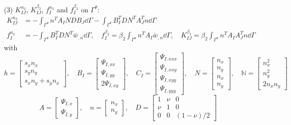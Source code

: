 (3) $K_{IJ}^{n_2}$, $K_{IJ}^{\beta_2}$, $f_I^{n_2}$ and $f_I^{\beta_2}$ on $\Gamma^{\theta}$:
\begin{equation}\label{eq:31}
\begin{aligned}
K_{IJ}^{n_2}&=-\int_{\Gamma^{\theta}}n^{T}A_INDB_J\dd\Gamma-\int_{\Gamma^{\theta}}B_I^{T}DN^{T}A_J^{T}n\dd\Gamma\\
f_I^{n_2}&=-\int_{\Gamma^{\theta}}B_I^{T}DN^{T}\bar{w}_{,n}\dd\Gamma,\quad
f_I^{\beta_2}=\beta_2\int_{\Gamma^{\theta}}n^{T}A_I\bar{w}_{,n}\dd\Gamma,\quad
K_{IJ}^{\beta_2}=\beta_2\int_{\Gamma^{\theta}}n^{T}A_IA_J^{T}n\dd\Gamma
\end{aligned}
\end{equation}
with
\begin{equation}\label{eq:32}
h=\begin{bmatrix}s_xn_x\\ s_yn_y\\ s_xn_y+s_yn_x\end{bmatrix},\quad
B_I=\begin{bmatrix}\Psi_{I,xx}\\ \Psi_{I,yy}\\ 2\Psi_{I,xy}\end{bmatrix},\quad
C_I=\begin{bmatrix}\Psi_{I,xxx}\\ \Psi_{I,xxy}\\ \Psi_{I,xyy}\\ \Psi_{I,yyy}\end{bmatrix},\quad
N=\begin{bmatrix}n_x\\ n_y\\ n_x\\ n_y\end{bmatrix},\quad
\mathbb{N}=\begin{bmatrix}n_x^{2}\\ n_y^{2}\\ 2n_xn_y\end{bmatrix}
\end{equation}
\begin{equation}\label{eq:33}
A=\begin{bmatrix}\Psi_{I,x}\\ \Psi_{I,y}\end{bmatrix},\quad
n=\begin{bmatrix}n_x\\ n_y\end{bmatrix},\quad
D=\begin{bmatrix}1&\nu&0\\ \nu&1&0\\ 0&0&(1-\nu)/2\end{bmatrix}
\end{equation}
